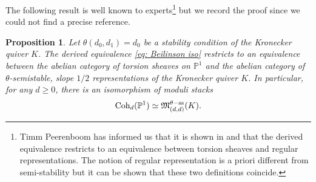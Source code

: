 \documentclass[10pt]{amsart}
\newcommand{\Coh}{\textnormal{Coh}}
\newcommand{\+}{{}^+}
\newtheorem {proposition}[theorem]{Proposition}
\theoremstyle{definition}
\theoremstyle {definition}
\theoremstyle {definition}
\begin{document}
The following result is well known to experts\footnote{Timm Peerenboom has informed us that it is shown in \cite[Prop. 4.3]{GeigleLenzing} and \cite[Prop. 2.20]{Timm} that the derived equivalence restricts to an equivalence between torsion sheaves and regular representations. The notion of regular representation is a priori different from semi-stability but it can be shown that these two definitions coincide. } but we record the proof since we could not find a precise reference.  

\begin{proposition} \label{prop:belinsonisoofstacks} Let $\theta(d_0,d_1)=d_0$ be a stability condition of the Kronecker quiver $K$. The derived equivalence \eqref{eq: Beilinson iso} restricts to an equivalence between the abelian category of torsion sheaves on $\mathbb{P}^1$ and the abelian category of $\theta$-semistable, slope $1/2$ representations of the Kronecker quiver $K$. In particular, for any $d \geq 0$, there is an isomorphism of moduli stacks
   \[  \Coh_{d}(\mathbb{P}^1) \simeq \mathfrak{M}^{\theta-\mathrm{ss}}_{(d,d)}(K). \]
\end{proposition}
\end{document}
